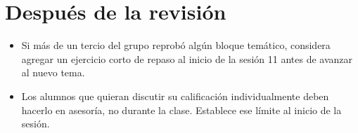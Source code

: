 \documentclass[12pt, oneside]{article}
\begin{document}
\section{Después de la revisión}

\begin{notaprofesor}[Seguimiento]
  \begin{itemize}
    \item Si más de un tercio del grupo reprobó algún bloque temático,
          considera agregar un ejercicio corto de repaso al inicio de la
          sesión 11 antes de avanzar al nuevo tema.
    \item Los alumnos que quieran discutir su calificación individualmente
          deben hacerlo en asesoría, no durante la clase.
          Establece ese límite al inicio de la sesión.
  \end{itemize}
\end{notaprofesor}
\end{document}

